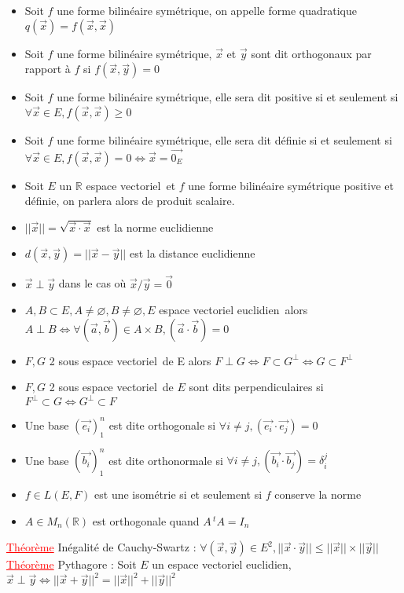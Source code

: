 \documentclass[a4paper, french]{article}
\newcommand{\R}{\mathbb{R}}
\newcommand{\ev}{espace vectoriel}
\newcommand{\eve}{espace vectoriel euclidien}
\newcommand{\de}{\delta}
\newcommand{\thm}{\textcolor{red}{\underline{Théorème} }}
\begin{document}
	 \begin{itemize}
		  \item Soit $f$ une forme bilinéaire symétrique, on appelle forme quadratique $q(\vec{x})=f(\vec{x},\vec{x})$
		 \item Soit $f$ une forme bilinéaire symétrique, $\vec{x}$ et $\vec{y}$ sont dit orthogonaux par rapport à $f$ si $f(\vec{x},\vec{y})=0$
		 \item Soit $f$ une forme bilinéaire symétrique, elle sera dit positive si et seulement si $\forall \vec{x} \in  E, f(\vec{x},\vec{x})\geqslant 0$
		 \item Soit $f$ une forme bilinéaire symétrique, elle sera dit définie si et seulement si ${\forall \vec{x} \in  E}, f(\vec{x},\vec{x})=0 \iff \vec{x}=\vec{0_E}$
		 \item Soit $E$ un $\R$ \ev \, et $f$ une forme bilinéaire symétrique positive et définie, on parlera alors de produit scalaire.
		 \item $||\vec{x}||=\sqrt{\vec{x} \cdot \vec{x}}$ est la norme euclidienne
		 \item $d(\vec{x},\vec{y})=||\vec{x}-\vec{y}||$ est la distance euclidienne
		 \item $\vec{x}\perp\vec{y}$ dans le cas où $\vec{x}/\vec{y}=\vec{0}$
		 \item $A,B \subset E, A \neq \varnothing, B \neq \varnothing, E$ \eve \, alors $A\perp B \iff {\forall (\vec{a},\vec{b}) \in A\times B}, {(\vec{a}\cdot\vec{b})=0}$
		 \item $F,G$ 2 sous \ev \, de E alors $F\perp G \iff F\subset G^{\perp} \iff G \subset F^{\perp}$
		 \item $F,G$ 2 sous \ev \, de $E$ sont dits perpendiculaires si ${F^{\perp} \subset G \iff G^{\perp} \subset F}$
		 \item Une base $(\vec{e_i})_1^n$ est dite orthogonale si $\forall i \neq j, (\vec{e_i}\cdot \vec{e_j})=0$
		 \item Une base $(\vec{b_i})_1^n$ est dite orthonormale si $\forall i \neq j, (\vec{b_i}\cdot \vec{b_j})=\de_i^j$
		 \item $f \in L(E,F)$ est une isométrie si et seulement si $f$ conserve la norme 
		 \item $A \in M_n(\R)$ est orthogonale quand $A\,^tA=I_n$
	 \end{itemize}
	  \thm Inégalité de Cauchy-Swartz : $\forall (\vec{x},\vec{y}) \in E^2, ||\vec{x}\cdot\vec{y}|| \leqslant ||\vec{x}|| \times ||\vec{y}||$ \\
	  \thm Pythagore : Soit $E$ un \eve, $\vec{x} \perp \vec{y} \iff {||\vec{x}+\vec{y}||^2=||\vec{x}||^2+||\vec{y}||^2}$ \\
\end{document}
